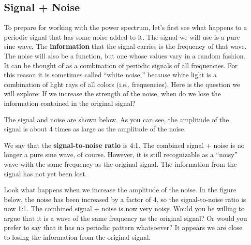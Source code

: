 {{{{\subsection{Signal + Noise}

	To prepare for working with the power spectrum, let's first see what happens to a periodic signal that has some noise added to it.  The signal we will use is a pure sine wave.  The {\bf information} that the signal carries is the frequency of that wave.  The noise will also be a function, but one whose values vary in a random fashion.  It can be thought of as a combination of periodic signals of all frequencies.  For this reason it is sometimes called ``white noise,'' because white light is a combination of light rays of all colors (i.e., frequencies).  Here is the question we will explore:  If we increase the strength of the noise, when do we lose the information contained in the original signal?
	
	The signal and noise are shown below.  
As you can see, the amplitude of the signal is about 4 times as large as the amplitude of the noise.  
\linebreak
\vspace{16pt}


\vspace{100pt}

\noindent
We say that the {\bf signal-to-noise ratio} is 4:1.
\label{faint noise}  
The combined signal + noise is no longer a pure sine wave, of course.  However, it is still recognizable as a ``noisy'' wave with the same frequency as the original signal.  The information from the signal has not yet been lost.

	Look what happens when 
we increase the amplitude of the noise.  In the figure below, the noise has been increased by a factor of 4, so the signal-to-noise ratio is now 1:1.  The combined signal + noise is now very noisy.  Would you be willing to argue that it is a wave of the same frequency as the original signal?  Or would you prefer to say that it has no periodic pattern whatsoever?  It appears we are close to losing the information from the original signal.
\vspace{30pt}



}}}}
